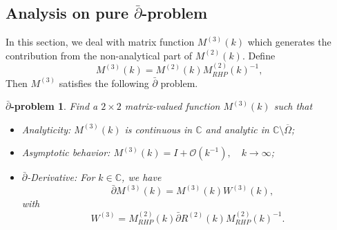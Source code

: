\documentclass[11pt]{article}
\numberwithin{equation}{section}
\newtheorem{dbar}{$\bar{\partial}$-problem}
\begin{document}
\subsection{\texorpdfstring{Analysis on pure $\bar{\partial}$-problem}{Analysis on pure dbar-problem}}\label{subs3.4}
In this section, we deal with matrix function $M^{(3)}(k)$ which generates the contribution from the non-analytical part of  $M^{(2)}(k)$. Define
\begin{equation}\label{eq33}
    M^{(3)}(k) = M^{(2)}(k)M_{RHP}^{(2)}(k)^{-1},
\end{equation}
Then $M^{(3)}$ satisfies the following $\bar{\partial}$ problem.
\begin{dbar}\label{dbar1}
    Find a $2 \times 2$ matrix-valued function $M^{(3)}(k)$ such that
\begin{itemize}
    \item Analyticity: $M^{(3)}(k)$ is continuous in $\mathbb{C}$ and analytic in $\mathbb{C} \setminus \overline{\Omega}$;
    \item Asymptotic behavior: $M^{(3)}(k) = I + \mathcal{O}(k^{-1}), \quad k \to \infty$;
    \item $\bar{\partial}$-Derivative: For $k \in \mathbb{C}$, we have
    \begin{equation*}
        \quad \bar{\partial} M^{(3)}(k) = M^{(3)}(k) W^{(3)}(k),
    \end{equation*}
    with
    \begin{equation*}
        W^{(3)} = M_{RHP}^{(2)}(k) \bar{\partial} R^{(2)}(k) M_{RHP}^{(2)}(k)^{-1}.
    \end{equation*}
\end{itemize}
\end{dbar}
\end{document}
